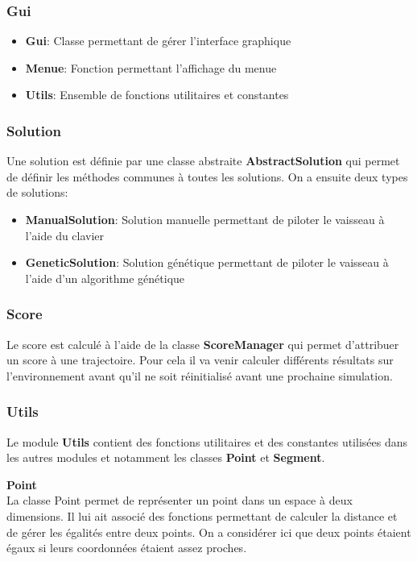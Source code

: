 \documentclass[french,a4paper,10pt,twocolumn]{article}
\begin{document}
\subsubsection{Gui}
\begin{itemize}
    \item \textbf{Gui}: Classe permettant de gérer l'interface graphique
    \item \textbf{Menue}: Fonction permettant l'affichage du menue
    \item \textbf{Utils}: Ensemble de fonctions utilitaires et constantes
\end{itemize}

\subsubsection{Solution}    

Une solution est définie par une classe abstraite \textbf{AbstractSolution} qui permet de définir les méthodes communes à toutes les solutions.
On a ensuite deux types de solutions:
\begin{itemize}
    \item \textbf{ManualSolution}: Solution manuelle permettant de piloter le vaisseau à l'aide du clavier
    \item \textbf{GeneticSolution}: Solution génétique permettant de piloter le vaisseau à l'aide d'un algorithme génétique
\end{itemize}

\subsubsection{Score}

Le score est calculé à l'aide de la classe \textbf{ScoreManager} qui permet d'attribuer un score à une trajectoire. 
Pour cela il va venir calculer différents résultats sur l'environnement avant qu'il ne soit réinitialisé avant une prochaine simulation.


\subsubsection{Utils}

Le module \textbf{Utils} contient des fonctions utilitaires et des constantes utilisées dans les autres modules et notamment les classes
\textbf{Point} et \textbf{Segment}.

\textbf{Point}\\
La classe Point permet de représenter un point dans un espace à deux dimensions. Il lui ait associé des fonctions permettant de calculer la distance et de gérer
les égalités entre deux points. 
On a considérer ici que deux points étaient égaux si leurs coordonnées étaient assez proches.
\end{document}
